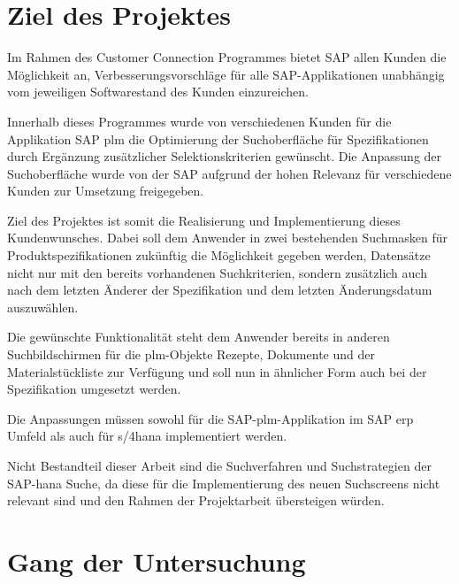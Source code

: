 \section{Ziel des Projektes}


Im Rahmen des Customer Connection Programmes bietet SAP allen Kunden die Möglichkeit an, Verbesserungsvorschläge für alle SAP-Applikationen unabhängig vom jeweiligen Softwarestand des Kunden einzureichen.\autocite[Vgl.][]{CCP}

Innerhalb dieses Programmes wurde von verschiedenen Kunden für die Applikation SAP \ac{plm} die Optimierung der Suchoberfläche für Spezifikationen durch Ergänzung zusätzlicher Selektionskriterien gewünscht. 
Die Anpassung der Suchoberfläche wurde von der SAP aufgrund der hohen Relevanz für verschiedene Kunden zur Umsetzung freigegeben.\autocite[Vgl.][]{ADSESPEC}

Ziel des Projektes ist somit die Realisierung und Implementierung dieses Kundenwunsches. Dabei soll dem Anwender in zwei bestehenden Suchmasken für Produktspezifikationen zukünftig die Möglichkeit gegeben werden, Datensätze nicht nur mit den bereits vorhandenen Suchkriterien, sondern zusätzlich auch nach dem letzten Änderer der Spezifikation und dem letzten Änderungsdatum auszuwählen.\autocite[Vgl.][]{ADSESPEC}

Die gewünschte Funktionalität steht dem Anwender bereits in anderen Suchbildschirmen für die \acs{plm}-Objekte Rezepte, Dokumente und der Materialstückliste zur Verfügung und soll nun in ähnlicher Form auch bei der Spezifikation umgesetzt werden.\autocite[Vgl.][]{ADSESPEC}

Die Anpassungen müssen sowohl für die SAP-\ac{plm}-Applikation im SAP \ac{erp} Umfeld als auch für \ac{s/4hana} implementiert werden.

Nicht Bestandteil dieser Arbeit sind die Suchverfahren und Suchstrategien der SAP-\ac{hana} Suche, da diese für die Implementierung des neuen Suchscreens nicht relevant sind und den Rahmen der Projektarbeit übersteigen würden.

\section{Gang der Untersuchung}

